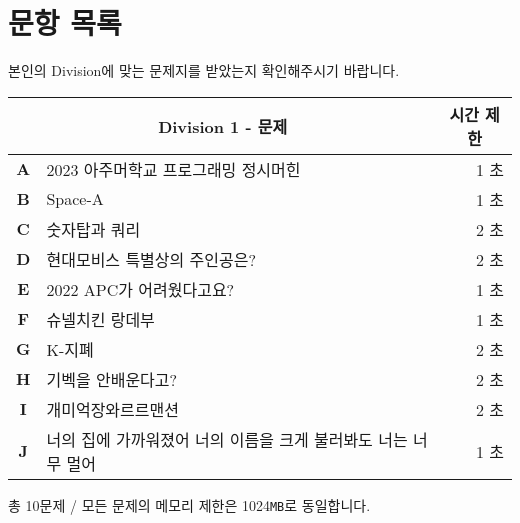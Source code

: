\newpage
\vspace*{5cm}

{\centering \section*{문항 목록}}
\begin{center}    
    본인의 Division에 맞는 문제지를 받았는지 확인해주시기 바랍니다.
    
    \vspace*{0.3cm}
    \renewcommand{\arraystretch}{1.6}
    \begin{tabular}{|c l|r|}
        \hline
        \multicolumn{2}{|c}{\textbf{Division 1} - 문제} & \multicolumn{1}{|c|}{시간 제한} \\ 
        \hline
        \hline
        \textbf{A} & 2023 아주머학교 프로그래밍 정시머힌 & 1 초\\
        \textbf{B} & Space-A & 1 초\\
        \textbf{C} & 숫자탑과 쿼리 & 2 초\\
        \textbf{D} & 현대모비스 특별상의 주인공은? & 2 초\\
        \textbf{E} & 2022 APC가 어려웠다고요? & 1 초\\
        \textbf{F} & 슈넬치킨 랑데부 & 1 초\\
        \textbf{G} & K-지폐 & 2 초\\
        \textbf{H} & 기벡을 안배운다고? & 2 초\\
        \textbf{I} & 개미억장와르르맨션 & 2 초\\
        \textbf{J} & 너의 집에 가까워졌어 너의 이름을 크게 불러봐도 너는 너무 멀어 & 1 초\\
        \hline
    \end{tabular}
    
    \vspace*{0.2cm}

    총 10문제 / 모든 문제의 메모리 제한은 1024\texttt{MB}로 동일합니다.    
\end{center}